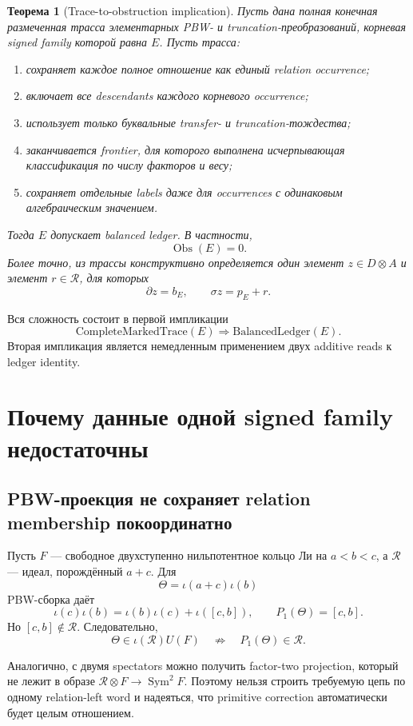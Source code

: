 \documentclass[11pt,a4paper]{article}
\newtheorem{theorem}{Теорема}[section]
\theoremstyle{definition}
\theoremstyle{remark}
\newcommand{\Sym}{\operatorname{Sym}}
\newcommand{\Rel}{\mathcal R}
\newcommand{\Obs}{\operatorname{Obs}}
\begin{document}
\begin{theorem}[Trace-to-obstruction implication]\label{thm:trace-to-obs}
Пусть дана полная конечная размеченная трасса элементарных PBW- и
truncation-преобразований, корневая signed family которой равна $E$. Пусть
трасса:
\begin{enumerate}[label=(T\arabic*)]
\item сохраняет каждое полное отношение как единый relation occurrence;
\item включает все descendants каждого корневого occurrence;
\item использует только буквальные transfer- и truncation-тождества;
\item заканчивается frontier, для которого выполнена исчерпывающая
классификация по числу факторов и весу;
\item сохраняет отдельные labels даже для occurrences с одинаковым
алгебраическим значением.
\end{enumerate}
Тогда $E$ допускает balanced ledger. В частности,
\[
 \Obs(E)=0.
\]
Более точно, из трассы конструктивно определяется один элемент
$z\in D\otimes A$ и элемент $r\in\Rel$, для которых
\[
 \partial z=b_E,
 \qquad
 \sigma z=p_E+r.
\]
\end{theorem}

Вся сложность состоит в первой импликации
\[
 \text{CompleteMarkedTrace}(E)
 \Longrightarrow
 \text{BalancedLedger}(E).
\]
Вторая импликация является немедленным применением двух additive reads к
ledger identity.

\section{Почему данные одной signed family недостаточны}

\subsection{PBW-проекция не сохраняет relation membership покоординатно}

Пусть $F$ --- свободное двухступенно нильпотентное кольцо Ли на
$a<b<c$, а $\Rel$ --- идеал, порождённый $a+c$. Для
\[
 \Theta=\iota(a+c)\iota(b)
\]
PBW-сборка даёт
\[
 \iota(c)\iota(b)=\iota(b)\iota(c)+\iota([c,b]),
 \qquad
 P_1(\Theta)=[c,b].
\]
Но $[c,b]\notin\Rel$. Следовательно,
\[
 \Theta\in\iota(\Rel)U(F)
 \quad\not\Longrightarrow\quad
 P_1(\Theta)\in\Rel.
\]

Аналогично, с двумя spectators можно получить factor-two projection, который
не лежит в образе $\Rel\otimes F\to\Sym^2F$. Поэтому нельзя строить требуемую
цепь по одному relation-left word и надеяться, что primitive correction
автоматически будет целым отношением.
\end{document}
